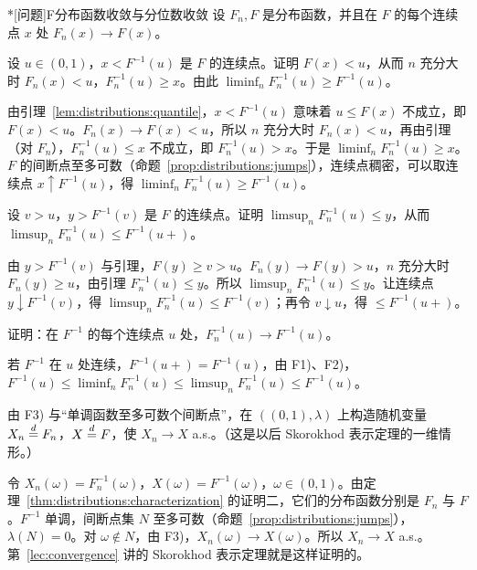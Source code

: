 \begin{probleme}*[问题]{F}{分布函数收敛与分位数收敛}
设 $F_n,F$ 是分布函数，并且在 $F$ 的每个连续点 $x$ 处 $F_n(x)\to F(x)$。
\begin{questions}
\item 设 $u\in(0,1)$，$x<F^{-1}(u)$ 是 $F$ 的连续点。证明 $F(x)<u$，从而 $n$ 充分大时 $F_n(x)<u$，$F_n^{-1}(u)\geqslant x$。由此 $\liminf_nF_n^{-1}(u)\geqslant F^{-1}(u)$。
\begin{solution}
由引理~\ref{lem:distributions:quantile}，$x<F^{-1}(u)$ 意味着 $u\leqslant F(x)$ 不成立，即 $F(x)<u$。$F_n(x)\to F(x)<u$，所以 $n$ 充分大时 $F_n(x)<u$，再由引理（对 $F_n$），$F_n^{-1}(u)\leqslant x$ 不成立，即 $F_n^{-1}(u)>x$。于是 $\liminf_nF_n^{-1}(u)\geqslant x$。$F$ 的间断点至多可数（命题~\ref{prop:distributions:jumps}），连续点稠密，可以取连续点 $x\uparrow F^{-1}(u)$，得 $\liminf_nF_n^{-1}(u)\geqslant F^{-1}(u)$。
\end{solution}
\item 设 $v>u$，$y>F^{-1}(v)$ 是 $F$ 的连续点。证明 $\limsup_nF_n^{-1}(u)\leqslant y$，从而 $\limsup_nF_n^{-1}(u)\leqslant F^{-1}(u+)$。
\begin{solution}
由 $y>F^{-1}(v)$ 与引理，$F(y)\geqslant v>u$。$F_n(y)\to F(y)>u$，$n$ 充分大时 $F_n(y)\geqslant u$，由引理 $F_n^{-1}(u)\leqslant y$。所以 $\limsup_nF_n^{-1}(u)\leqslant y$。让连续点 $y\downarrow F^{-1}(v)$，得 $\limsup_nF_n^{-1}(u)\leqslant F^{-1}(v)$；再令 $v\downarrow u$，得 $\leqslant F^{-1}(u+)$。
\end{solution}
\item 证明：在 $F^{-1}$ 的每个连续点 $u$ 处，$F_n^{-1}(u)\to F^{-1}(u)$。
\begin{solution}
若 $F^{-1}$ 在 $u$ 处连续，$F^{-1}(u+)=F^{-1}(u)$，由 F1)、F2)，$F^{-1}(u)\leqslant\liminf_nF_n^{-1}(u)\leqslant\limsup_nF_n^{-1}(u)\leqslant F^{-1}(u)$。
\end{solution}
\item 由 F3) 与“单调函数至多可数个间断点”，在 $((0,1),\lambda)$ 上构造随机变量 $X_n\stackrel{d}{=} F_n$，$X\stackrel{d}{=} F$，使 $X_n\to X$ a.s.。（这是以后 Skorokhod 表示定理的一维情形。）
\begin{solution}
令 $X_n(\omega)=F_n^{-1}(\omega)$，$X(\omega)=F^{-1}(\omega)$，$\omega\in(0,1)$。由定理~\ref{thm:distributions:characterization} 的证明二，它们的分布函数分别是 $F_n$ 与 $F$。$F^{-1}$ 单调，间断点集 $N$ 至多可数（命题~\ref{prop:distributions:jumps}），$\lambda(N)=0$。对 $\omega\notin N$，由 F3)，$X_n(\omega)\to X(\omega)$。所以 $X_n\to X$ a.s.。第~\ref{lec:convergence} 讲的 Skorokhod 表示定理就是这样证明的。
\end{solution}
\end{questions}
\end{probleme}

